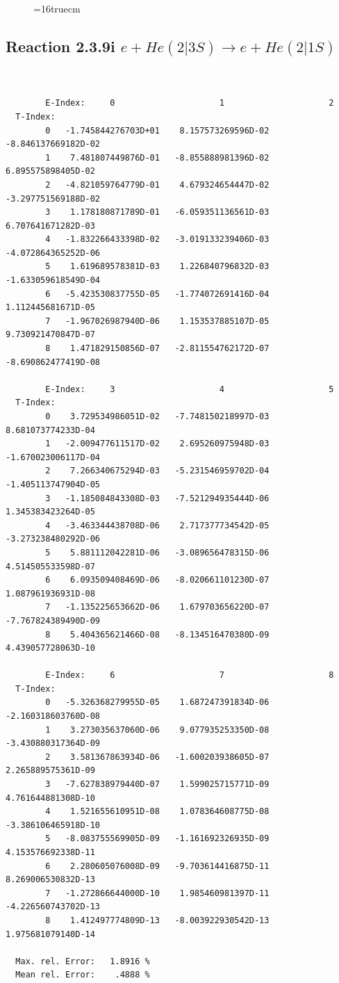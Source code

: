 \documentclass[12pt,dvips]{article}
\begin{document}
\begin{figure} \label{2.3.9h}
\epsfxsize=16truecm
\end{figure}
\newpage



\subsection{
Reaction 2.3.9i $ e + He(2|3S) \rightarrow e + He(2|1S) $
}


\begin{small}\begin{verbatim}


        E-Index:     0                     1                     2
  T-Index:
        0   -1.745844276703D+01    8.157573269596D-02   -8.846137669182D-02
        1    7.481807449876D-01   -8.855888981396D-02    6.895575898405D-02
        2   -4.821059764779D-01    4.679324654447D-02   -3.297751569188D-02
        3    1.178180871789D-01   -6.059351136561D-03    6.707641671282D-03
        4   -1.832266433398D-02   -3.019133239406D-03   -4.072864365252D-06
        5    1.619689578381D-03    1.226840796832D-03   -1.633059618549D-04
        6   -5.423530837755D-05   -1.774072691416D-04    1.112445681671D-05
        7   -1.967026987940D-06    1.153537885107D-05    9.730921470847D-07
        8    1.471829150856D-07   -2.811554762172D-07   -8.690862477419D-08

        E-Index:     3                     4                     5
  T-Index:
        0    3.729534986051D-02   -7.748150218997D-03    8.681073774233D-04
        1   -2.009477611517D-02    2.695260975948D-03   -1.670023006117D-04
        2    7.266340675294D-03   -5.231546959702D-04   -1.405113747904D-05
        3   -1.185084843308D-03   -7.521294935444D-06    1.345383423264D-05
        4   -3.463344438708D-06    2.717377734542D-05   -3.273238480292D-06
        5    5.881112042281D-06   -3.089656478315D-06    4.514505533598D-07
        6    6.093509408469D-06   -8.020661101230D-07    1.087961936931D-08
        7   -1.135225653662D-06    1.679703656220D-07   -7.767824389490D-09
        8    5.404365621466D-08   -8.134516470380D-09    4.439057728063D-10

        E-Index:     6                     7                     8
  T-Index:
        0   -5.326368279955D-05    1.687247391834D-06   -2.160318603760D-08
        1    3.273035637060D-06    9.077935253350D-08   -3.430880317364D-09
        2    3.581367863934D-06   -1.600203938605D-07    2.265889575361D-09
        3   -7.627838979440D-07    1.599025715771D-09    4.761644881308D-10
        4    1.521655610951D-08    1.078364608775D-08   -3.386106465918D-10
        5   -8.083755569905D-09   -1.161692326935D-09    4.153576692338D-11
        6    2.280605076008D-09   -9.703614416875D-11    8.269006530832D-13
        7   -1.272866644000D-10    1.985460981397D-11   -4.226560743702D-13
        8    1.412497774809D-13   -8.003922930542D-13    1.975681079140D-14

  Max. rel. Error:   1.8916 %
  Mean rel. Error:    .4888 %


\end{verbatim}\end{small}
\end{document}
